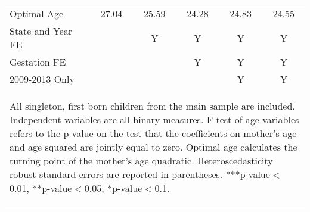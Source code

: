 \documentclass[10pt,letterpaper,subeqn]{beamer}
\begin{document}
\begin{frame}
\begin{table}[htbp]
{\begin{tabular}{l*{5}{c}}
Optimal Age &27.04&25.59&24.28&24.83&24.55 \\
State and Year FE&&Y&Y&Y&Y\\ Gestation FE &&&Y&Y&Y\\
2009-2013 Only&&&&Y&Y\\ \bottomrule
\multicolumn{6}{p{16cm}}{\begin{footnotesize} All singleton,
first born children from the main sample are included. Independent
variables are all binary measures. F-test of age variables refers to the p-value on the test that               the coefficients on mother's age and age squared are jointly               equal to zero. Optimal age calculates the turning point of the mother's age               quadratic. Heteroscedasticity robust standard errors are reported in               parentheses.
***p-value$<$0.01, **p-value$<$0.05, *p-value$<$0.1.
\end{footnotesize}}\end{tabular}}
\end{table}
\end{frame}
\end{document}

